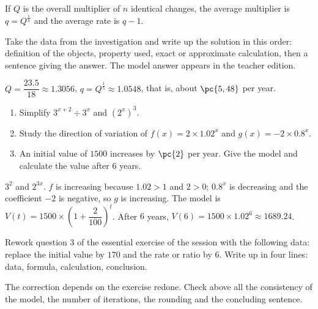 \begin{summary}If $Q$ is the overall multiplier of $n$ identical changes, the average multiplier is $q=Q^{\frac1n}$ and the average rate is $q-1$.\end{summary}

\begin{example}
Take the data from the investigation and write up the solution in this order: definition of the objects, property used, exact or approximate calculation, then a sentence giving the answer. The model answer appears in the teacher edition.
\end{example}
\begin{solution}$Q=\dfrac{\num{23,5}}{18}\approx\num{1,3056}$, $q=Q^{\frac15}\approx\num{1,0548}$, that is, about $\pc{5,48}$ per year.\end{solution}

\begin{exercise}[essential]
\begin{enumerate}\item Simplify $3^{x+2}\div3^x$ and $(2^x)^3$.\item Study the direction of variation of $f(x)=2\times\num{1,02}^x$ and $g(x)=-2\times\num{0,8}^x$.\item An initial value of $1500$ increases by $\pc{2}$ per year. Give the model and calculate the value after $6$ years.\end{enumerate}
\end{exercise}
\begin{solution}$3^2$ and $2^{3x}$. $f$ is increasing because $\num{1,02}>1$ and $2>0$; $\num{0,8}^x$ is decreasing and the coefficient $-2$ is negative, so $g$ is increasing. The model is $V(t)=1500\times\left(1+\dfrac{2}{100}\right)^t$. After $6$ years, $V(6)=1500\times\num{1,02}^6\approx\num{1689,24}$.\end{solution}


\begin{homework}Rework question 3 of the essential exercise of the session with the following data: replace the initial value by $170$ and the rate or ratio by $6$. Write up in four lines: data, formula, calculation, conclusion.\end{homework}
\begin{solution}The correction depends on the exercise redone. Check above all the consistency of the model, the number of iterations, the rounding and the concluding sentence.\end{solution}

